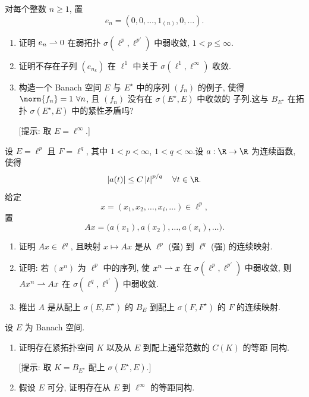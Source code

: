 \begin{exercise}
\label{exer:3.18}
对每个整数 $n\ge1$, 置
\begin{equation*}
e_n=(0,0,\dots,1_{(n)},0,\dots).
\end{equation*}
\begin{enumerate}[label=\arabic*., leftmargin=2.2em, itemsep=0.25em]
	\item 证明 $e_n\rightharpoonup0$ 在弱拓扑 $\sigma(\ell^p,\ell^{p'})$ 中弱收敛,
	      $1<p\le\infty$.
	\item 证明不存在子列 $(e_{n_k})$ 在 $\ell^1$ 中关于 $\sigma(\ell^1,\ell^\infty)$
	      收敛.
	\item 构造一个 Banach 空间 $E$ 与 $E^\star$ 中的序列 $(f_n)$ 的例子, 使得
	      $\norm{f_n}=1\ \forall n$, 且 $(f_n)$ 没有在 $\sigma(E^\star,E)$ 中收敛的
	      子列.这与 $B_{E^\star}$ 在拓扑 $\sigma(E^\star,E)$ 中的紧性矛盾吗?

	      [提示: 取 $E=\ell^\infty$.]
\end{enumerate}
\end{exercise}

\begin{exercise}
\label{exer:3.19}
设 $E=\ell^p$ 且 $F=\ell^q$, 其中 $1<p<\infty$, $1<q<\infty$.设
$a:\R\to\R$ 为连续函数, 使得
\begin{equation*}
\abs{a(t)}\le C\abs{t}^{p/q}\quad\forall t\in\R.
\end{equation*}
给定
\begin{equation*}
x=(x_1,x_2,\dots,x_i,\dots)\in\ell^p,
\end{equation*}
置
\begin{equation*}
Ax=\bigl(a(x_1),a(x_2),\dots,a(x_i),\dots\bigr).
\end{equation*}
\begin{enumerate}[label=\arabic*., leftmargin=2.2em, itemsep=0.25em]
	\item 证明 $Ax\in\ell^q$, 且映射 $x\mapsto Ax$ 是从 $\ell^p$ (强) 到
	      $\ell^q$ (强) 的连续映射.
	\item 证明: 若 $(x^n)$ 为 $\ell^p$ 中的序列, 使 $x^n\rightharpoonup x$ 在
	      $\sigma(\ell^p,\ell^{p'})$ 中弱收敛, 则 $Ax^n\rightharpoonup Ax$ 在
	      $\sigma(\ell^q,\ell^{q'})$ 中弱收敛.
	\item 推出 $A$ 是从配上 $\sigma(E,E^\star)$ 的 $B_E$ 到配上
	      $\sigma(F,F^\star)$ 的 $F$ 的连续映射.
\end{enumerate}
\end{exercise}

\begin{exercise}
\label{exer:3.20}
设 $E$ 为 Banach 空间.

\begin{enumerate}[label=\arabic*., leftmargin=2.2em, itemsep=0.25em]
	\item 证明存在紧拓扑空间 $K$ 以及从 $E$ 到配上通常范数的 $C(K)$ 的等距
	      同构.

	      [提示: 取 $K=B_{E^\star}$ 配上 $\sigma(E^\star,E)$.]
	\item 假设 $E$ 可分, 证明存在从 $E$ 到 $\ell^\infty$ 的等距同构.
\end{enumerate}
\end{exercise}

